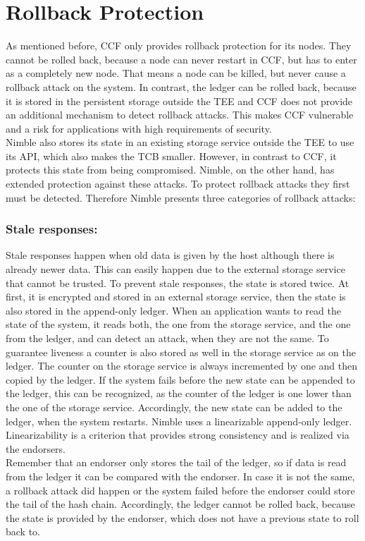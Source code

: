\section{Rollback Protection}
As mentioned before, CCF only provides rollback protection for its nodes. They cannot be rolled back, because a node can never restart in CCF, but has to enter as a completely new node. That means a node can be killed, but never cause a rollback attack on the system. In contrast, the ledger can be rolled back, because it is stored in the persistent storage outside the TEE and CCF does not provide an additional mechanism to detect rollback attacks. This makes CCF vulnerable and a risk for applications with high requirements of security.\\
 Nimble also stores its state in an existing storage service outside the TEE to use its API, which also makes the TCB smaller. However, in contrast to CCF, it protects this state from being compromised. Nimble, on the other hand, has extended protection against these attacks. To protect rollback attacks they first must be detected. Therefore Nimble presents three categories of rollback attacks:
	\subsubsection*{Stale responses:} Stale responses happen when old data is given by the host although there is already newer data. This can easily happen due to the external storage service that cannot be trusted. To prevent stale responses, the state is stored twice. At first, it is encrypted and stored in an external storage service, then the state is also stored in the append-only ledger. When an application wants to read the state of the system, it reads both, the one from the storage service, and the one from the ledger, and can detect an attack, when they are not the same. To guarantee liveness a counter is also stored as well in the storage service as on the ledger. The counter on the storage service is always incremented by one and then copied by the ledger. If the system fails before the new state can be appended to the ledger, this can be recognized, as the counter of the ledger is one lower than the one of the storage service. Accordingly, the new state can be added to the ledger, when the system restarts. Nimble uses a linearizable append-only ledger. Linearizability is a criterion that provides strong consistency and is realized via the endorsers.\\
	 Remember that an endorser only stores the tail of the ledger, so if data is read from the ledger it can be compared with the endorser. In case it is not the same, a rollback attack did happen or the system failed before the endorser could store the tail of the hash chain. Accordingly, the ledger cannot be rolled back, because the state is provided by the endorser, which does not have a previous state to roll back to. 
